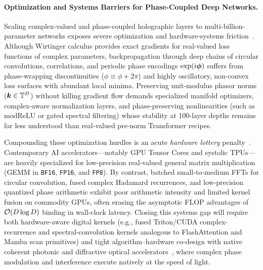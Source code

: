 \paragraph{Optimization and Systems Barriers for Phase-Coupled Deep Networks.}
Scaling complex-valued and phase-coupled holographic layers to multi-billion-parameter networks exposes severe optimization and hardware-systems friction~\cite{BASSEY_CVNN_SURVEY,TRABELSI_2018_DCN}.
Although Wirtinger calculus provides exact gradients for real-valued loss functions of complex parameters, backpropagation through deep chains of circular convolutions, correlations, and periodic phase encodings $\exp(i\boldsymbol{\phi})$ suffers from phase-wrapping discontinuities ($\phi \equiv \phi + 2\pi$) and highly oscillatory, non-convex loss surfaces with abundant local minima.
Preserving unit-modulus phasor norms ($\boldsymbol{k} \in \mathbb{T}^D$) without killing gradient flow demands specialized manifold optimizers, complex-aware normalization layers, and phase-preserving nonlinearities (such as $\mathrm{modReLU}$ or gated spectral filtering) whose stability at 100-layer depths remains far less understood than real-valued pre-norm Transformer recipes.

Compounding these optimization hurdles is an acute \emph{hardware lottery} penalty~\cite{HOOKER_2021_HARDWARE_LOTTERY}.
Contemporary AI accelerators---notably GPU Tensor Cores and systolic TPUs---are heavily specialized for low-precision real-valued general matrix multiplication (GEMM in \texttt{BF16}, \texttt{FP16}, and \texttt{FP8}).
By contrast, batched small-to-medium FFTs for circular convolution, fused complex Hadamard recurrences, and low-precision quantized phase arithmetic exhibit poor arithmetic intensity and limited kernel fusion on commodity GPUs, often erasing the asymptotic FLOP advantages of $\mathcal{O}\!\left(D \log D\right)$ binding in wall-clock latency.
Closing this systems gap will require both hardware-aware digital kernels (e.g., fused Triton/CUDA complex-recurrence and spectral-convolution kernels analogous to FlashAttention and Mamba scan primitives) and tight algorithm--hardware co-design with native coherent photonic and diffractive optical accelerators~\cite{WETZSTEIN_2020_OPTICAL_AI,MCMAHON_2023_PHYSICS_OPTICAL_NN}, where complex phase modulation and interference execute natively at the speed of light.

